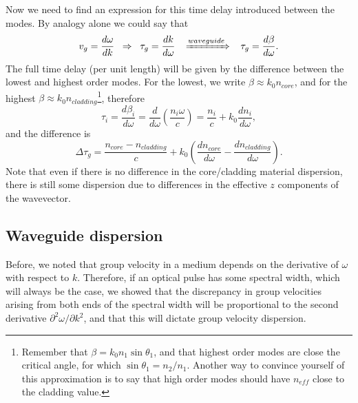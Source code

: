 Now we need to find an expression for this time delay introduced between the modes. By analogy alone we could say that
\begin{equation}
    v_g=\frac{d\omega}{dk}\;\;\Rightarrow\;\;\tau_g=\frac{dk}{d\omega}\;\;\;\xRightarrow{waveguide}\;\;\;\tau_g=\frac{d\beta}{d\omega}.
\end{equation}
The full time delay (per unit length) will be given by the difference between the lowest and highest order modes. For the lowest, we write $\beta\approx k_0n_{core}$, and for the highest $\beta\approx k_0n_{cladding}$\footnote{Remember that $\beta=k_0n_1\sin{\theta_1}$, and that highest order modes are close the critical angle, for which $\sin{\theta_1}=n_2/n_1$. Another way to convince yourself of this approximation is to say that high order modes should have $n_{eff}$ close to the cladding value.}, therefore
\begin{equation}
    \tau_i=\frac{d\beta_i}{d\omega}=\frac{d}{d\omega}\left(\frac{n_i\omega}{c}\right)=\frac{n_i}{c}+k_0\frac{dn_i}{d\omega},
\end{equation}
and the difference is
\begin{equation}
    \Delta\tau_g=\frac{n_{core}-n_{cladding}}{c}+k_0\left(\frac{dn_{core}}{d\omega}-\frac{dn_{cladding}}{d\omega}\right).
\end{equation}
Note that even if there is no difference in the core/cladding material dispersion, there is still some dispersion due to differences in the effective $z$ components of the wavevector.

\subsection{Waveguide dispersion}

Before, we noted that group velocity in a medium depends on the derivative of $\omega$ with respect to $k$. Therefore, if an optical pulse has some spectral width, which will always be the case, we showed  that the discrepancy in group velocities arising from both ends of the spectral width will be proportional to the second derivative $\partial^2\omega/\partial k^2$, and that this will dictate group velocity dispersion.


